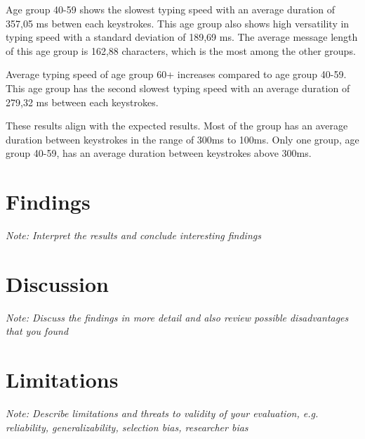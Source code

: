 Age group 40-59 shows the slowest typing speed with an average duration of 357,05 ms betwen each keystrokes.
This age group also shows high versatility in typing speed with a standard deviation of 189,69 ms.
The average message length of this age group is 162,88 characters, which is the most among the other groups.

Average typing speed of age group 60+ increases compared to age group 40-59.
This age group has the second slowest typing speed with an average duration of 279,32 ms between each keystrokes.

These results align with the expected results.
Most of the group has an average duration between keystrokes in the range of 300ms to 100ms.
Only one group, age group 40-59, has an average duration between keystrokes above 300ms.


\section{Findings}

\textit{Note: Interpret the results and conclude interesting findings}

\section{Discussion}

\textit{Note: Discuss the findings in more detail and also review possible disadvantages that you found}

\section{Limitations}

\textit{Note: Describe limitations and threats to validity of your evaluation, e.g. reliability, generalizability, selection bias, researcher bias}
